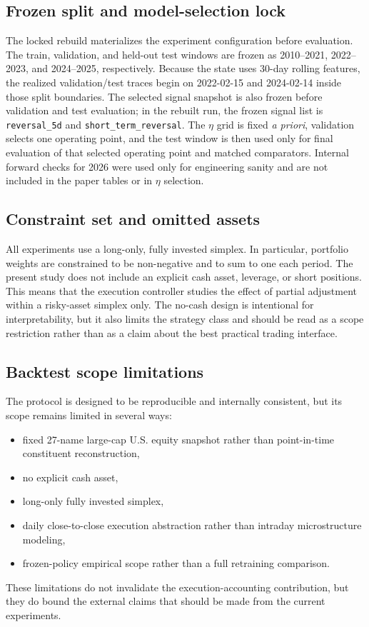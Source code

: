 \documentclass[10pt,twocolumn]{article}
\begin{document}
\subsection{Frozen split and model-selection lock}
The locked rebuild materializes the experiment configuration before evaluation. The train, validation, and held-out test windows are frozen as 2010--2021, 2022--2023, and 2024--2025, respectively. Because the state uses 30-day rolling features, the realized validation/test traces begin on 2022-02-15 and 2024-02-14 inside those split boundaries. The selected signal snapshot is also frozen before validation and test evaluation; in the rebuilt run, the frozen signal list is \texttt{reversal\_5d} and \texttt{short\_term\_reversal}. The $\eta$ grid is fixed \emph{a priori}, validation selects one operating point, and the test window is then used only for final evaluation of that selected operating point and matched comparators. Internal forward checks for 2026 were used only for engineering sanity and are not included in the paper tables or in $\eta$ selection.

\subsection{Constraint set and omitted assets}
All experiments use a long-only, fully invested simplex. In particular, portfolio weights are constrained to be non-negative and to sum to one each period. The present study does not include an explicit cash asset, leverage, or short positions. This means that the execution controller studies the effect of partial adjustment within a risky-asset simplex only. The no-cash design is intentional for interpretability, but it also limits the strategy class and should be read as a scope restriction rather than as a claim about the best practical trading interface.

\subsection{Backtest scope limitations}
The protocol is designed to be reproducible and internally consistent, but its scope remains limited in several ways:
\begin{itemize}[leftmargin=*,itemsep=1pt]
\item fixed 27-name large-cap U.S. equity snapshot rather than point-in-time constituent reconstruction,
\item no explicit cash asset,
\item long-only fully invested simplex,
\item daily close-to-close execution abstraction rather than intraday microstructure modeling,
\item frozen-policy empirical scope rather than a full retraining comparison.
\end{itemize}
These limitations do not invalidate the execution-accounting contribution, but they do bound the external claims that should be made from the current experiments.
\end{document}
